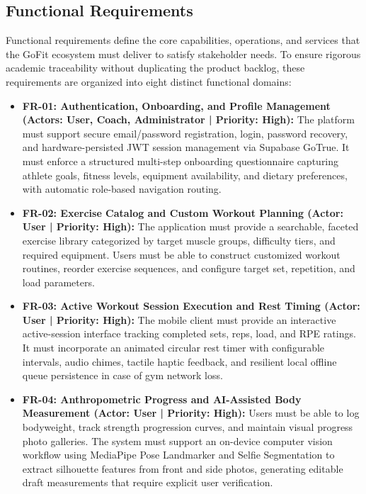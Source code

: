 \documentclass[12pt,a4paper,openany]{report}
\begin{document}
\subsection{Functional Requirements}


Functional requirements define the core capabilities, operations, and services that the GoFit ecosystem must deliver to satisfy stakeholder needs. To ensure rigorous academic traceability without duplicating the product backlog, these requirements are organized into eight distinct functional domains:

\begin{itemize}
    \item \textbf{FR-01: Authentication, Onboarding, and Profile Management (Actors: User, Coach, Administrator | Priority: High):} The platform must support secure email/password registration, login, password recovery, and hardware-persisted JWT session management via Supabase GoTrue. It must enforce a structured multi-step onboarding questionnaire capturing athlete goals, fitness levels, equipment availability, and dietary preferences, with automatic role-based navigation routing.
    \item \textbf{FR-02: Exercise Catalog and Custom Workout Planning (Actor: User | Priority: High):} The application must provide a searchable, faceted exercise library categorized by target muscle groups, difficulty tiers, and required equipment. Users must be able to construct customized workout routines, reorder exercise sequences, and configure target set, repetition, and load parameters.
    \item \textbf{FR-03: Active Workout Session Execution and Rest Timing (Actor: User | Priority: High):} The mobile client must provide an interactive active-session interface tracking completed sets, reps, load, and RPE ratings. It must incorporate an animated circular rest timer with configurable intervals, audio chimes, tactile haptic feedback, and resilient local offline queue persistence in case of gym network loss.
    \item \textbf{FR-04: Anthropometric Progress and AI-Assisted Body Measurement (Actor: User | Priority: High):} Users must be able to log bodyweight, track strength progression curves, and maintain visual progress photo galleries. The system must support an on-device computer vision workflow using MediaPipe Pose Landmarker and Selfie Segmentation to extract silhouette features from front and side photos, generating editable draft measurements that require explicit user verification.

\end{itemize}
\end{document}
